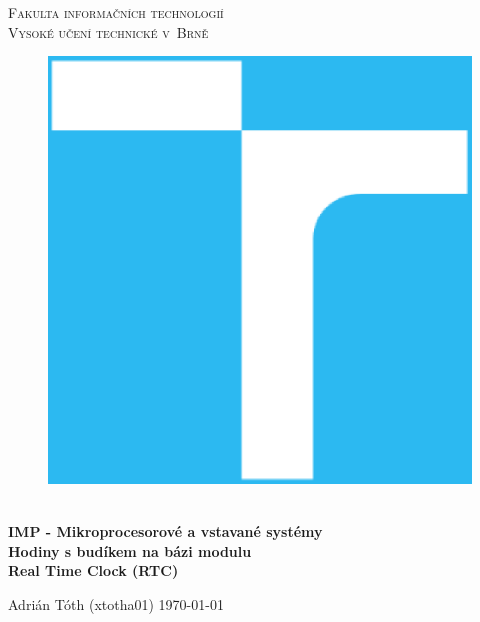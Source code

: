 \documentclass[11pt,a4paper]{article}
\begin{document}

\begin{titlepage}
    \begin{center}
        \Huge
        \textsc{
            Fakulta informačních technologií\\
            Vysoké učení technické v~Brně
        }
        \vspace{100px}
        \begin{figure}[!h]
            \centering
            \includegraphics[scale=0.3]{img/vutbr-fit-logo.eps}
        \end{figure}
        \\[20mm]
        \huge{
            \textbf{
                IMP - Mikroprocesorové a vstavané systémy
            }
        }
        \\[2em]
        \LARGE{
            \textbf{
                Hodiny s budíkem na bázi modulu\\
                Real Time Clock (RTC)
            }
        }
        \vfill
    \end{center}
        \Large{
            Adrián Tóth (xtotha01) \hfill \today
        }

\end{titlepage}
\end{document}
